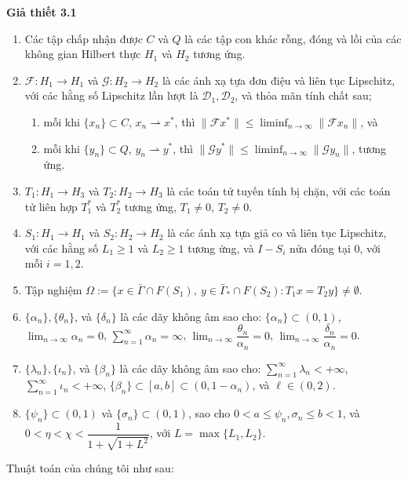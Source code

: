\documentclass[11pt,a4paper]{article}
\theoremstyle{plain}
\theoremstyle{definition}
\theoremstyle{remark}
\numberwithin{equation}{section}
\newcommand{\Fc}{\mathcal{F}}
\newcommand{\Gc}{\mathcal{G}}
\newcommand{\Dc}{\mathcal{D}}
\newcommand{\nm}[1]{\lVert #1\rVert}
\newcommand{\wto}{\rightharpoonup}
\newcommand{\Gam}{\bar{\Gamma}}
\newcommand{\Gams}{\bar{\Gamma}_{*}}
\newcommand{\Fix}[1]{F(#1)}
\begin{document}
\medskip
\noindent\textbf{Giả thiết 3.1}\label{asm:3.1}
\begin{enumerate}[label=(A\arabic*),leftmargin=*]
\item Các tập chấp nhận được $C$ và $Q$ là các tập con khác rỗng, đóng và lồi của các không gian Hilbert thực $H_1$ và $H_2$ tương ứng.
\item $\Fc:H_1\to H_1$ và $\Gc:H_2\to H_2$ là các ánh xạ tựa đơn điệu và liên tục Lipschitz, với các hằng số Lipschitz lần lượt là $\Dc_1,\Dc_2$, và thỏa mãn tính chất sau;
\begin{enumerate}[label=(\roman*)]
\item mỗi khi $\{x_n\}\subset C$, $x_n\wto x^{*}$, thì $\nm{\Fc x^{*}}\le\liminf_{n\to\infty}\nm{\Fc x_n}$, và
\item mỗi khi $\{y_n\}\subset Q$, $y_n\wto y^{*}$, thì $\nm{\Gc y^{*}}\le\liminf_{n\to\infty}\nm{\Gc y_n}$, tương ứng.
\end{enumerate}
\item $T_1:H_1\to H_3$ và $T_2:H_2\to H_3$ là các toán tử tuyến tính bị chặn, với các toán tử liên hợp $T_1^{*}$ và $T_2^{*}$ tương ứng, $T_1\ne 0$, $T_2\ne 0$.
\item $S_1:H_1\to H_1$ và $S_2:H_2\to H_2$ là các ánh xạ tựa giả co và liên tục Lipschitz, với các hằng số $L_1\ge 1$ và $L_2\ge 1$ tương ứng, và $I-S_i$ nửa đóng tại $0$, với mỗi $i=1,2$.
\item Tập nghiệm $\Omega:=\{x\in\Gam\cap \Fix{S_1},\ y\in\Gams\cap \Fix{S_2}:T_1x=T_2y\}\ne\emptyset$.
\item $\{\alpha_n\},\{\theta_n\}$, và $\{\delta_n\}$ là các dãy không âm sao cho: $\{\alpha_n\}\subset(0,1)$, $\lim_{n\to\infty}\alpha_n=0$, $\sum_{n=1}^{\infty}\alpha_n=\infty$, $\lim_{n\to\infty}\dfrac{\theta_n}{\alpha_n}=0$, $\lim_{n\to\infty}\dfrac{\delta_n}{\alpha_n}=0$.
\item $\{\lambda_n\},\{\iota_n\}$, và $\{\beta_n\}$ là các dãy không âm sao cho: $\sum_{n=1}^{\infty}\lambda_n<+\infty$, $\sum_{n=1}^{\infty}\iota_n<+\infty$, $\{\beta_n\}\subset[a,b]\subset(0,1-\alpha_n)$, và $\ell\in(0,2)$.
\item $\{\psi_n\}\subset(0,1)$ và $\{\sigma_n\}\subset(0,1)$, sao cho $0<a\le\psi_n,\sigma_n\le b<1$, và $0<\eta<\chi<\dfrac{1}{1+\sqrt{1+L^2}}$, với $L=\max\{L_1,L_2\}$.
\end{enumerate}

Thuật toán của chúng tôi như sau:
\end{document}
